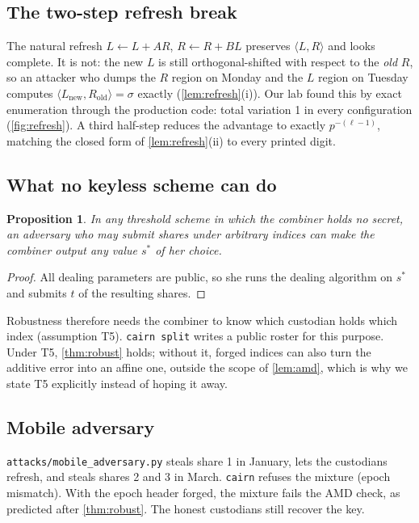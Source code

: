 \documentclass[10.5pt,a4paper]{article}
\theoremstyle{plain}
\newtheorem{proposition}[theorem]{Proposition}
\theoremstyle{definition}
\newcommand{\ip}[2]{\langle #1,#2\rangle}
\newcommand{\code}[1]{\texttt{#1}}
\begin{document}
\subsection{The two-step refresh break}
The natural refresh $L\gets L+AR$, $R\gets R+BL$ preserves $\ip LR$ and looks complete. It is not: the new $L$ is still orthogonal-shifted with respect to the \emph{old} $R$, so an attacker who dumps the $R$ region on Monday and the $L$ region on Tuesday computes $\ip{L_{\mathrm{new}}}{R_{\mathrm{old}}}=\sigma$ exactly (\cref{lem:refresh}(i)). Our lab found this by exact enumeration through the production code: total variation 1 in every configuration (\cref{fig:refresh}). A third half-step reduces the advantage to exactly $p^{-(\ell-1)}$, matching the closed form of \cref{lem:refresh}(ii) to every printed digit.

\subsection{What no keyless scheme can do}
\begin{proposition}\label{prop:keyless}
In any threshold scheme in which the combiner holds no secret, an adversary who may submit shares under arbitrary indices can make the combiner output any value $s^\ast$ of her choice.
\end{proposition}
\begin{proof}
All dealing parameters are public, so she runs the dealing algorithm on $s^\ast$ and submits $t$ of the resulting shares.
\end{proof}
Robustness therefore needs the combiner to know which custodian holds which index (assumption T5). \code{cairn split} writes a public roster for this purpose. Under T5, \cref{thm:robust} holds; without it, forged indices can also turn the additive error into an affine one, outside the scope of \cref{lem:amd}, which is why we state T5 explicitly instead of hoping it away.

\subsection{Mobile adversary}\label{sec:attack-mobile}
\code{attacks/mobile\_adversary.py} steals share 1 in January, lets the custodians refresh, and steals shares 2 and 3 in March. \code{cairn} refuses the mixture (epoch mismatch). With the epoch header forged, the mixture fails the AMD check, as predicted after \cref{thm:robust}. The honest custodians still recover the key.
\end{document}
